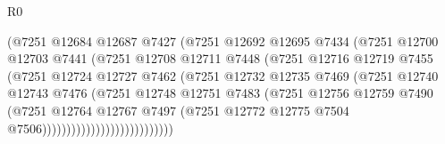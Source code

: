 \begin{lexlean}{R0}
\begin{coremodule}
                                  (@7251
                                    @12684
                                    @12687
                                    @7427
                                    (@7251
                                      @12692
                                      @12695
                                      @7434
                                      (@7251
                                        @12700
                                        @12703
                                        @7441
                                        (@7251
                                          @12708
                                          @12711
                                          @7448
                                          (@7251
                                            @12716
                                            @12719
                                            @7455
                                            (@7251
                                              @12724
                                              @12727
                                              @7462
                                              (@7251
                                                @12732
                                                @12735
                                                @7469
                                                (@7251
                                                  @12740
                                                  @12743
                                                  @7476
                                                  (@7251
                                                    @12748
                                                    @12751
                                                    @7483
                                                    (@7251
                                                      @12756
                                                      @12759
                                                      @7490
                                                      (@7251
                                                        @12764
                                                        @12767
                                                        @7497
                                                        (@7251
                                                          @12772
                                                          @12775
                                                          @7504
                                                          @7506)))))))))))))))))))))))))))

\end{coremodule}
\end{lexlean}
